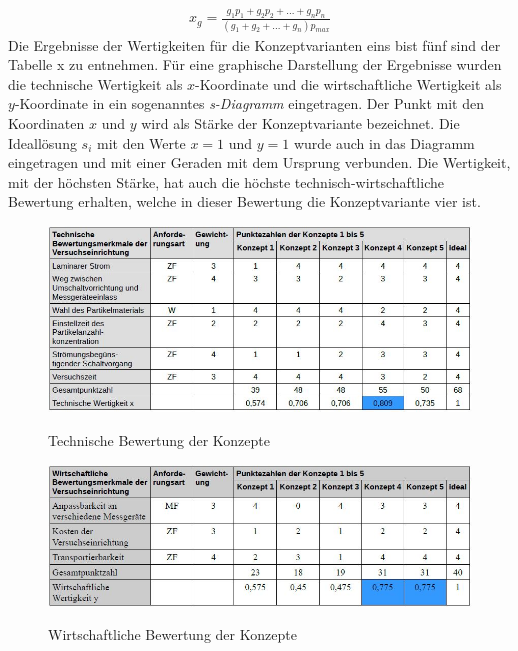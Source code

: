 \begin{align*}
	x_g = \frac{g_1p_1 + g_2p_2 + ... + g_np_n}{(g_1 + g_2 + ... + g_n)p_\textit{max}}
\end{align*}
Die Ergebnisse der Wertigkeiten f\"{u}r die Konzeptvarianten eins bist f\"{u}nf sind der Tabelle x zu entnehmen. F\"{u}r eine graphische Darstellung der Ergebnisse wurden die technische Wertigkeit als \(x\)-Koordinate und die wirtschaftliche Wertigkeit als \(y\)-Koordinate in ein sogenanntes \textit{s-Diagramm} eingetragen. Der Punkt mit den Koordinaten \(x\) und \(y\) wird als St\"{a}rke der Konzeptvariante bezeichnet. Die Ideall\"{o}sung \(s_i\) mit den Werte \(x = 1\) und \(y = 1\) wurde auch in das Diagramm eingetragen und mit einer Geraden mit dem Ursprung verbunden. Die Wertigkeit, mit der h\"{o}chsten St\"{a}rke, hat auch die h\"{o}chste technisch-wirtschaftliche Bewertung erhalten, welche in dieser Bewertung die Konzeptvariante vier ist.
\begin{figure}[H]
        \myfloatalign
        {\includegraphics[width=.8\linewidth]{gfx/conclusion/TabEvalTwo.jpg}} \quad
        \caption[Technische Bewertung der Konzepte]
        {Technische Bewertung der Konzepte}
        \label{fig:TabEvalOne}
\end{figure}
\begin{figure}[H]
        \myfloatalign
        {\includegraphics[width=.8\linewidth]{gfx/conclusion/TabEvalThree.jpg}} \quad
        \caption[Wirtschaftliche Bewertung der Konzepte]
        {Wirtschaftliche Bewertung der Konzepte}
        \label{fig:TabEvalOne}
\end{figure}
